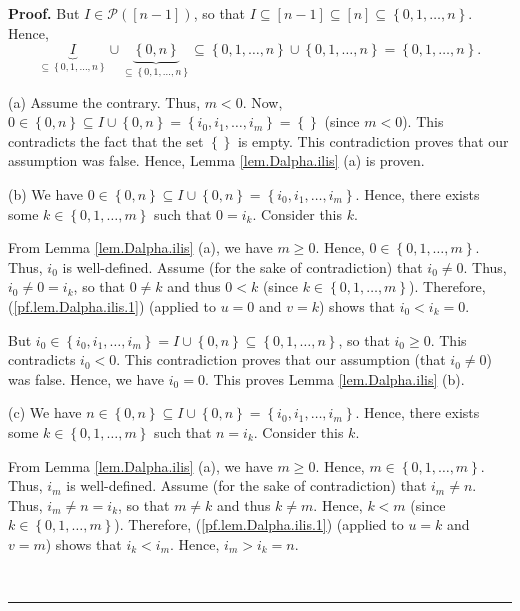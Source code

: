 \documentclass[numbers=enddot,12pt,final,onecolumn,notitlepage,abstracton]{scrartcl}
\theoremstyle{definition}
\newenvironment{proof}[1][Proof]{\noindent\textbf{#1.} }{\ \rule{0.5em}{0.5em}}
\newenvironment{verlong}{}{}
\begin{document}
\begin{verlong}
\begin{footnotesize}
\begin{proof}
But $I\in\mathcal{P}\left(  \left[  n-1\right]  \right)  $, so that
$I\subseteq\left[  n-1\right]  \subseteq\left[  n\right]  \subseteq\left\{
0,1,\ldots,n\right\}  $. Hence,%
\[
\underbrace{I}_{\subseteq\left\{  0,1,\ldots,n\right\}  }\cup
\underbrace{\left\{  0,n\right\}  }_{\subseteq\left\{  0,1,\ldots,n\right\}
}\subseteq\left\{  0,1,\ldots,n\right\}  \cup\left\{  0,1,\ldots,n\right\}
=\left\{  0,1,\ldots,n\right\}  .
\]


(a) Assume the contrary. Thus, $m<0$. Now, $0 \in\left\{  0, n\right\}
\subseteq I\cup\left\{  0,n\right\}  = \left\{  i_{0},i_{1},\ldots
,i_{m}\right\}  = \left\{  \right\}  $ (since $m < 0$). This contradicts the
fact that the set $\left\{  \right\}  $ is empty. This contradiction proves
that our assumption was false. Hence, Lemma \ref{lem.Dalpha.ilis} (a) is proven.

(b) We have $0\in\left\{  0,n\right\}  \subseteq I\cup\left\{  0,n\right\}
=\left\{  i_{0},i_{1},\ldots,i_{m}\right\}  $. Hence, there exists some
$k\in\left\{  0,1,\ldots,m\right\}  $ such that $0=i_{k}$. Consider this $k$.

From Lemma \ref{lem.Dalpha.ilis} (a), we have $m\geq0$. Hence, $0\in\left\{
0,1,\ldots,m\right\}  $. Thus, $i_{0}$ is well-defined. Assume (for the sake
of contradiction) that $i_{0}\neq0$. Thus, $i_{0}\neq0=i_{k}$, so that $0\neq
k$ and thus $0<k$ (since $k\in\left\{  0,1,\ldots,m\right\}  $). Therefore,
(\ref{pf.lem.Dalpha.ilis.1}) (applied to $u=0$ and $v=k$) shows that
$i_{0}<i_{k}=0$.

But $i_{0}\in\left\{  i_{0},i_{1},\ldots,i_{m}\right\}  =I\cup\left\{
0,n\right\}  \subseteq\left\{  0,1,\ldots,n\right\}  $, so that $i_{0}\geq0$.
This contradicts $i_{0}<0$. This contradiction proves that our assumption
(that $i_{0}\neq0$) was false. Hence, we have $i_{0}=0$. This proves Lemma
\ref{lem.Dalpha.ilis} (b).

(c) We have $n\in\left\{  0,n\right\}  \subseteq I\cup\left\{  0,n\right\}
=\left\{  i_{0},i_{1},\ldots,i_{m}\right\}  $. Hence, there exists some
$k\in\left\{  0,1,\ldots,m\right\}  $ such that $n=i_{k}$. Consider this $k$.

From Lemma \ref{lem.Dalpha.ilis} (a), we have $m\geq0$. Hence, $m\in\left\{
0,1,\ldots,m\right\}  $. Thus, $i_{m}$ is well-defined. Assume (for the sake
of contradiction) that $i_{m}\neq n$. Thus, $i_{m}\neq n=i_{k}$, so that
$m\neq k$ and thus $k\neq m$. Hence, $k<m$ (since $k\in\left\{  0,1,\ldots
,m\right\}  $). Therefore, (\ref{pf.lem.Dalpha.ilis.1}) (applied to $u=k$ and
$v=m$) shows that $i_{k}<i_{m}$. Hence, $i_{m}>i_{k}=n$.


\end{proof}
\end{footnotesize}
\end{verlong}
\end{document}
